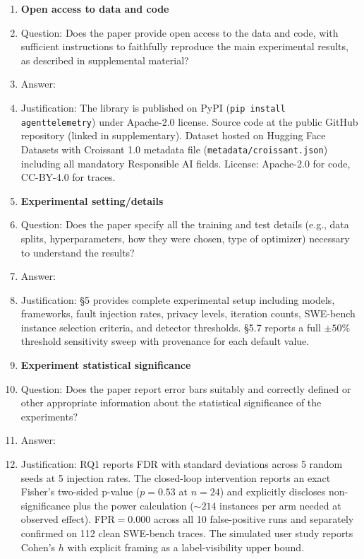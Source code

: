 \begin{enumerate}
\item {\bf Open access to data and code}
    \item[] Question: Does the paper provide open access to the data and code, with sufficient instructions to faithfully reproduce the main experimental results, as described in supplemental material?
    \item[] Answer: \answerYes{}
    \item[] Justification: The library is published on PyPI (\texttt{pip install agenttelemetry}) under Apache-2.0 license. Source code at the public GitHub repository (linked in supplementary). Dataset hosted on Hugging Face Datasets with Croissant 1.0 metadata file (\texttt{metadata/croissant.json}) including all mandatory Responsible AI fields. License: Apache-2.0 for code, CC-BY-4.0 for traces.

\item {\bf Experimental setting/details}
    \item[] Question: Does the paper specify all the training and test details (e.g., data splits, hyperparameters, how they were chosen, type of optimizer) necessary to understand the results?
    \item[] Answer: \answerYes{}
    \item[] Justification: \S5 provides complete experimental setup including models, frameworks, fault injection rates, privacy levels, iteration counts, SWE-bench instance selection criteria, and detector thresholds. \S5.7 reports a full $\pm{}50\%$ threshold sensitivity sweep with provenance for each default value.

\item {\bf Experiment statistical significance}
    \item[] Question: Does the paper report error bars suitably and correctly defined or other appropriate information about the statistical significance of the experiments?
    \item[] Answer: \answerYes{}
    \item[] Justification: RQ1 reports FDR with standard deviations across 5 random seeds at 5 injection rates. The closed-loop intervention reports an exact Fisher's two-sided p-value ($p{=}0.53$ at $n{=}24$) and explicitly discloses non-significance plus the power calculation ($\sim{}214$ instances per arm needed at observed effect). FPR$=$0.000 across all 10 false-positive runs and separately confirmed on 112 clean SWE-bench traces. The simulated user study reports Cohen's $h$ with explicit framing as a label-visibility upper bound.


\end{enumerate}
